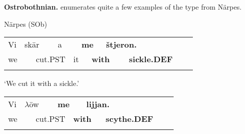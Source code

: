 \begin{styleBodytextC}
\textbf{Ostrobothnian. }\citet{Hummelstedt1934} enumerates quite a few examples of the type from Närpes. 

\end{styleBodytextC}

\begin{listWWNumileveli}
\item 

\begin{styleExample}
Närpes (SOb) 

\end{styleExample}

\end{listWWNumileveli}

\begin{listWWNumxlviiileveli}
\item 

\end{listWWNumxlviiileveli}

\begin{tabular}{llllllllllll}
\lsptoprule
Vi & \multicolumn{2}{l}{sk\=ar

} & \multicolumn{2}{l}{a

} & \multicolumn{2}{l}{{\bfseries me}

} & \multicolumn{2}{l}{{\bfseries štjeron.}

} & \multicolumn{2}{l}{} & \\
\multicolumn{2}{l}{we

} & \multicolumn{2}{l}{cut.PST

} & \multicolumn{2}{l}{it

} & \multicolumn{2}{l}{{\bfseries with}

} & \multicolumn{2}{l}{{\bfseries sickle.DEF}

} & \multicolumn{2}{l}{}\\
\lspbottomrule
\end{tabular}

\begin{styleTranslation}
‘We cut it with a sickle.’

\end{styleTranslation}

\begin{tabular}{llllllllll}
\lsptoprule
Vi & \multicolumn{2}{l}{$\lambda $\=ow

} & \multicolumn{2}{l}{{\bfseries me}

} & \multicolumn{2}{l}{{\bfseries lijjan.}

} & \multicolumn{2}{l}{} & \\
\multicolumn{2}{l}{we

} & \multicolumn{2}{l}{cut.PST

} & \multicolumn{2}{l}{{\bfseries with}

} & \multicolumn{2}{l}{{\bfseries scythe.DEF}

} & \multicolumn{2}{l}{}\\
\lspbottomrule
\end{tabular}

